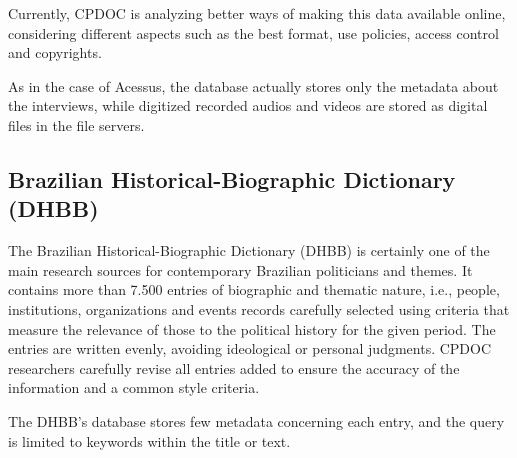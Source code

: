 Currently, CPDOC is analyzing better ways of making this data
available online, considering different aspects such as the best
format, use policies, access control and copyrights.

As in the case of Acessus, the database actually stores only the
metadata about the interviews, while digitized recorded audios and
videos are stored as digital files in the file servers.


\subsection{Brazilian Historical-Biographic Dictionary (DHBB)}

The Brazilian Historical-Biographic Dictionary (DHBB) is certainly one
of the main research sources for contemporary Brazilian politicians
and themes. It contains more than 7.500 entries of biographic and
thematic nature, i.e., people, institutions, organizations and events
records carefully selected using criteria that measure the relevance
of those to the political history for the given period. The entries
are written evenly, avoiding ideological or personal judgments. CPDOC
researchers carefully revise all entries added to ensure the accuracy
of the information and a common style criteria.


The DHBB's database stores few metadata concerning each entry, and the
query is limited to keywords within the title or text.



